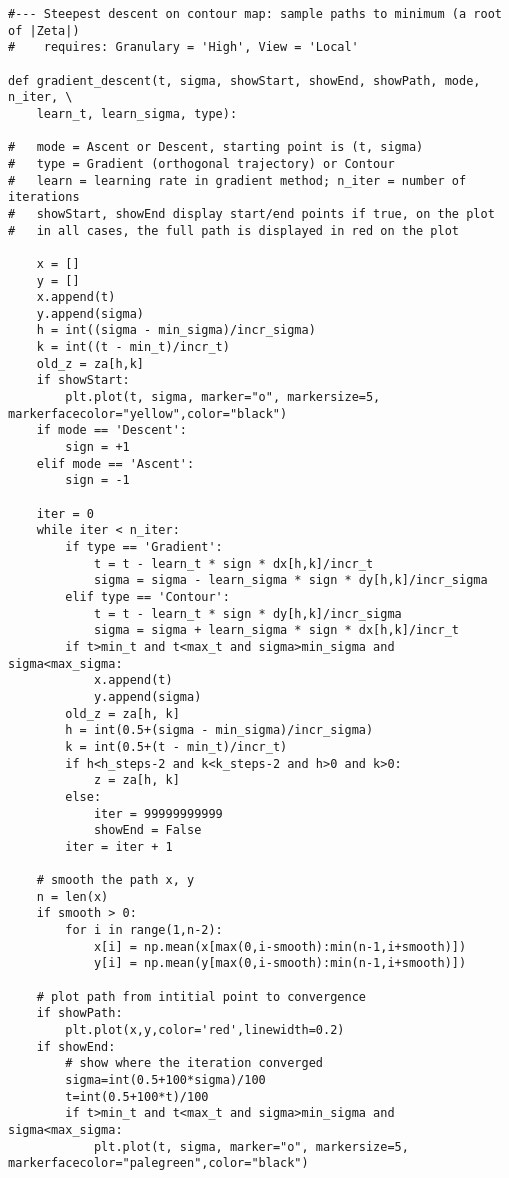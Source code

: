 \documentclass[oneside,10pt]{book}
\begin{document}
\begin{lstlisting}
#--- Steepest descent on contour map: sample paths to minimum (a root of |Zeta|)
#    requires: Granulary = 'High', View = 'Local'

def gradient_descent(t, sigma, showStart, showEnd, showPath, mode, n_iter, \
    learn_t, learn_sigma, type):

#   mode = Ascent or Descent, starting point is (t, sigma)
#   type = Gradient (orthogonal trajectory) or Contour
#   learn = learning rate in gradient method; n_iter = number of iterations
#   showStart, showEnd display start/end points if true, on the plot
#   in all cases, the full path is displayed in red on the plot

    x = []
    y = []
    x.append(t)
    y.append(sigma)
    h = int((sigma - min_sigma)/incr_sigma)
    k = int((t - min_t)/incr_t)
    old_z = za[h,k]
    if showStart:
        plt.plot(t, sigma, marker="o", markersize=5, markerfacecolor="yellow",color="black")
    if mode == 'Descent': 
        sign = +1
    elif mode == 'Ascent':
        sign = -1
         
    iter = 0
    while iter < n_iter:
        if type == 'Gradient':
            t = t - learn_t * sign * dx[h,k]/incr_t    
            sigma = sigma - learn_sigma * sign * dy[h,k]/incr_sigma     
        elif type == 'Contour':
            t = t - learn_t * sign * dy[h,k]/incr_sigma  
            sigma = sigma + learn_sigma * sign * dx[h,k]/incr_t 
        if t>min_t and t<max_t and sigma>min_sigma and sigma<max_sigma:   
            x.append(t)
            y.append(sigma)
        old_z = za[h, k]
        h = int(0.5+(sigma - min_sigma)/incr_sigma)
        k = int(0.5+(t - min_t)/incr_t)             
        if h<h_steps-2 and k<k_steps-2 and h>0 and k>0: 
            z = za[h, k]
        else:
            iter = 99999999999
            showEnd = False
        iter = iter + 1

    # smooth the path x, y
    n = len(x)
    if smooth > 0:
        for i in range(1,n-2):
            x[i] = np.mean(x[max(0,i-smooth):min(n-1,i+smooth)])
            y[i] = np.mean(y[max(0,i-smooth):min(n-1,i+smooth)])

    # plot path from intitial point to convergence
    if showPath:
        plt.plot(x,y,color='red',linewidth=0.2)
    if showEnd:   
        # show where the iteration converged
        sigma=int(0.5+100*sigma)/100
        t=int(0.5+100*t)/100
        if t>min_t and t<max_t and sigma>min_sigma and sigma<max_sigma:
            plt.plot(t, sigma, marker="o", markersize=5, markerfacecolor="palegreen",color="black")


\end{lstlisting}
\end{document}
